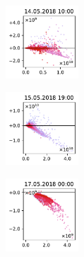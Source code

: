 \begin{figure}[H]
    \centering
    \begin{subfigure}
        \centering
        \includegraphics[width=0.30\textwidth,valign=t]{evaluation/figures/perturbations/perturbation-14.05.2018:10.00-biogenic-mul-1.5.pdf}
    \end{subfigure}
    \begin{subfigure}
        \centering
        \includegraphics[width=0.30\textwidth,valign=t]{evaluation/figures/perturbations/perturbation-15.05.2018:19.00-biogenic-mul-1.5.pdf}
    \end{subfigure}
    \begin{subfigure}
        \centering
        \includegraphics[width=0.30\textwidth,valign=t]{evaluation/figures/perturbations/perturbation-17.05.2018:00.00-biogenic-mul-1.5.pdf}
    \end{subfigure}


\end{figure}
